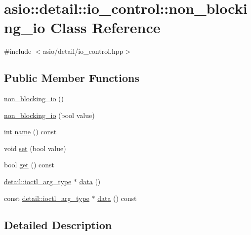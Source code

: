 \hypertarget{classasio_1_1detail_1_1io__control_1_1non__blocking__io}{}\section{asio\+:\+:detail\+:\+:io\+\_\+control\+:\+:non\+\_\+blocking\+\_\+io Class Reference}
\label{classasio_1_1detail_1_1io__control_1_1non__blocking__io}


{\ttfamily \#include $<$asio/detail/io\+\_\+control.\+hpp$>$}

\subsection*{Public Member Functions}
\begin{DoxyCompactItemize}
\item 
\hyperlink{classasio_1_1detail_1_1io__control_1_1non__blocking__io_aadfbd87db479ab02625be7698970ec8b}{non\+\_\+blocking\+\_\+io} ()
\item 
\hyperlink{classasio_1_1detail_1_1io__control_1_1non__blocking__io_a547ae22caa9d9e3704ae9fd54f074741}{non\+\_\+blocking\+\_\+io} (bool value)
\item 
int \hyperlink{classasio_1_1detail_1_1io__control_1_1non__blocking__io_afd8f2dadf22145f3404a3f51f6d645a2}{name} () const 
\item 
void \hyperlink{classasio_1_1detail_1_1io__control_1_1non__blocking__io_ac08a396e356508613be6f3e6108adcd4}{set} (bool value)
\item 
bool \hyperlink{classasio_1_1detail_1_1io__control_1_1non__blocking__io_a12fd972821c8fe5332f96088dc542df6}{get} () const 
\item 
\hyperlink{namespaceasio_1_1detail_a27f72e1b8b785eaaa59ddc6b41751106}{detail\+::ioctl\+\_\+arg\+\_\+type} $\ast$ \hyperlink{classasio_1_1detail_1_1io__control_1_1non__blocking__io_ad2d7dbf5ed6bc2ff2e9ec52f8c789047}{data} ()
\item 
const \hyperlink{namespaceasio_1_1detail_a27f72e1b8b785eaaa59ddc6b41751106}{detail\+::ioctl\+\_\+arg\+\_\+type} $\ast$ \hyperlink{classasio_1_1detail_1_1io__control_1_1non__blocking__io_ad97591bc0d0f186c35481f676c9c3f8e}{data} () const 
\end{DoxyCompactItemize}


\subsection{Detailed Description}


